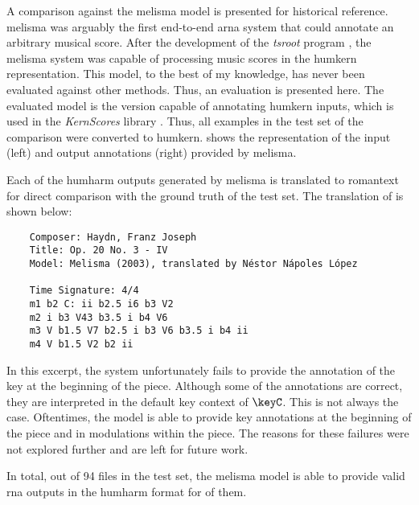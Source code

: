 
A comparison against the \gls{melisma} model is presented
for historical reference. \gls{melisma} was arguably the
first end-to-end \gls{arna} system that could annotate an
arbitrary musical score. After the development of the
\emph{tsroot} program \parencite{sapp2009tsroot}, the
\gls{melisma} system was capable of processing music scores
in the \gls{humkern} representation. This model, to the best
of my knowledge, has never been evaluated against other
methods. Thus, an evaluation is presented here. The
evaluated model is the version capable of annotating
\gls{humkern} inputs, which is used in the \emph{KernScores}
library \parencite{sapp2005online}. Thus, all examples in
the test set of the comparison were converted to
\gls{humkern}.  shows the
representation of the input (left) and output annotations
(right) provided by \gls{melisma}.


Each of the \gls{humharm} outputs generated by \gls{melisma}
is translated to \gls{romantext} for direct comparison with
the ground truth of the test set. The translation of
 is shown below:

\begin{verbatim}
    Composer: Haydn, Franz Joseph
    Title: Op. 20 No. 3 - IV
    Model: Melisma (2003), translated by Néstor Nápoles López
    
    Time Signature: 4/4
    m1 b2 C: ii b2.5 i6 b3 V2
    m2 i b3 V43 b3.5 i b4 V6
    m3 V b1.5 V7 b2.5 i b3 V6 b3.5 i b4 ii
    m4 V b1.5 V2 b2 ii
\end{verbatim}

In this excerpt, the system unfortunately fails to provide
the annotation of the key at the beginning of the piece.
Although some of the annotations are correct, they are
interpreted in the default key context of $\keyC$. This is
not always the case. Oftentimes, the model is able to
provide key annotations at the beginning of the piece and in
modulations within the piece. The reasons for these failures
were not explored further and are left for future work.

In total, out of 94 files in the test set, the \gls{melisma}
model is able to provide valid \gls{rna} outputs in the
\gls{humharm} format for  of them.
